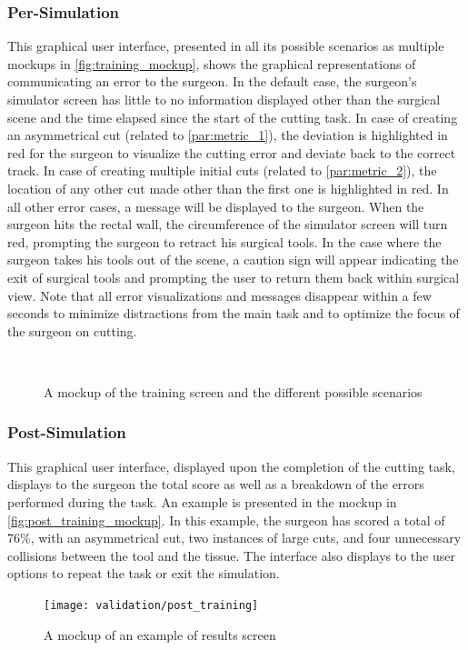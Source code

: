 \subsubsection{Per-Simulation}
This graphical user interface, presented in all its possible scenarios as multiple mockups in \autoref{fig:training_mockup}, shows the graphical representations of communicating an error to the surgeon. In the default case, the surgeon's simulator screen has little to no information displayed other than the surgical scene and the time elapsed since the start of the cutting task. In case of creating an asymmetrical cut (related to \autoref{par:metric_1}), the deviation is highlighted in red for the surgeon to visualize the cutting error and deviate back to the correct track. In case of creating multiple initial cuts (related to \autoref{par:metric_2}), the location of any other cut made other than the first one is highlighted in red. In all other error cases, a message will be displayed to the surgeon.
When the surgeon hits the rectal wall, the circumference of the simulator screen will turn red, prompting the surgeon to retract his surgical tools. In the case where the surgeon takes his tools out of the scene, a caution sign will appear indicating the exit of surgical tools and prompting the user to return them back within surgical view.
Note that all error visualizations and messages disappear within a few seconds to minimize distractions from the main task and to optimize the focus of the surgeon on cutting.
\begin{figure}
  \centering%
  \hfill%
  \\
  \hfill%
  \caption{A mockup of the training screen and the different possible scenarios}
  \label{fig:training_mockup}
\end{figure}

\subsubsection{Post-Simulation}
This graphical user interface, displayed upon the completion of the cutting task, displays to the surgeon the total score as well as a breakdown of the errors performed during the task. An example is presented in the mockup in \autoref{fig:post_training_mockup}. In this example, the surgeon has scored a total of 76\%, with an asymmetrical cut, two instances of large cuts, and four unnecessary collisions between the tool and the tissue. The interface also displays to the user options to repeat the task or exit the simulation.
\begin{figure}
  \centering%
  \texttt{[image: validation/post\_training]}
  \caption{A mockup of an example of results screen}
  \label{fig:post_training_mockup}
\end{figure}

